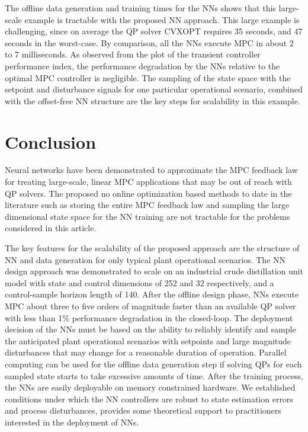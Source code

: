 \documentclass[preprint,5p, twocolumn, authoryear]{elsarticle}
\begin{document}
The offline data generation and training times 
for the NNs shows that this large-scale example
is tractable with the proposed NN approach.
This large example is challenging, 
since on average the QP solver CVXOPT requires 
35 seconds, and 
47 seconds in the worst-case. By comparison,  
all the NNs execute MPC in about 2 
to 7 milliseconds.
As observed from the plot of the transient controller 
performance index, the performance 
degradation by the NNs relative to 
the optimal MPC controller is negligible.
The sampling of the state space with 
the setpoint and disturbance signals
for one particular operational scenario,
combined with the offset-free NN structure
are the key steps for scalability in this example. 

\section{Conclusion} \label{sec:conclusion}
Neural networks have been demonstrated 
to approximate the MPC feedback law
for treating large-scale, linear MPC applications
that may be out of reach with QP solvers. 
The proposed no online optimization based
methods to date in the literature such as storing 
the entire MPC feedback law 
and sampling the large dimensional state space 
for the NN training are not tractable for the problems 
considered in this article.

The key features for the scalability of the proposed approach 
are the structure of NN and data generation for only
typical plant operational scenarios. 
The NN design approach was demonstrated to scale on an
industrial crude distillation unit model with state and
control dimensions of 252 and 32 respectively, and 
a control-sample horizon length of 140. 
After the offline design phase, NNs execute MPC 
about three to five orders of magnitude faster than an 
available QP solver 
with less than 1$\%$ performance degradation in the closed-loop.
The deployment decision of the NNs 
must be based on the ability to reliably identify 
and sample the anticipated plant operational scenarios 
with setpoints and large magnitude disturbances
that may change for a reasonable duration of operation.
Parallel computing can be used for
the offline data generation step if
solving QPs for each sampled state starts to take 
excessive amounts of time.
After the training process, 
the NNs are easily deployable on memory constrained 
hardware. We established conditions under which the 
NN controllers are robust to state estimation errors 
and process disturbances,
provides some theoretical support 
to practitioners interested in the deployment of NNs. 
\end{document}
